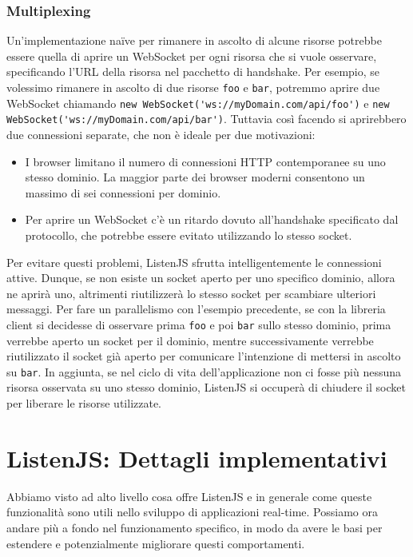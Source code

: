 \documentclass[12pt,a4paper,openright,twoside]{report}
\begin{document}
\subsection{Multiplexing}\label{multiplexing}
Un'implementazione naïve per rimanere in ascolto di alcune risorse potrebbe essere quella di aprire un WebSocket per ogni risorsa che si vuole osservare, specificando l'URL della risorsa nel pacchetto di handshake. Per esempio, se volessimo rimanere in ascolto di due risorse \lstinline{foo} e \lstinline{bar}, potremmo aprire due WebSocket chiamando \lstinline{new WebSocket('ws://myDomain.com/api/foo')} e \lstinline{new WebSocket('ws://myDomain.com/api/bar')}. Tuttavia così facendo si aprirebbero due connessioni separate, che non è ideale per due motivazioni:
\begin{itemize}
\item I browser limitano il numero di connessioni HTTP contemporanee su uno stesso dominio\cite{http11_rfc}. La maggior parte dei browser moderni consentono un massimo di sei connessioni per dominio.
\item Per aprire un WebSocket c'è un ritardo dovuto all'handshake specificato dal protocollo, che potrebbe essere evitato utilizzando lo stesso socket.
\end{itemize}

\bigskip

Per evitare questi problemi, ListenJS sfrutta intelligentemente le connessioni attive. Dunque, se non esiste un socket aperto per uno specifico dominio, allora ne aprirà uno, altrimenti riutilizzerà lo stesso socket per scambiare ulteriori messaggi. Per fare un parallelismo con l'esempio precedente, se con la libreria client si decidesse di osservare prima \lstinline{foo} e poi \lstinline{bar} sullo stesso dominio, prima verrebbe aperto un socket per il dominio, mentre successivamente verrebbe riutilizzato il socket già aperto per comunicare l'intenzione di mettersi in ascolto su \lstinline{bar}.
In aggiunta, se nel ciclo di vita dell'applicazione non ci fosse più nessuna risorsa osservata su uno stesso dominio, ListenJS si occuperà di chiudere il socket per liberare le risorse utilizzate.

\chapter{ListenJS: Dettagli implementativi}
Abbiamo visto ad alto livello cosa offre ListenJS e in generale come queste funzionalità sono utili nello sviluppo di applicazioni real-time. Possiamo ora andare più a fondo nel funzionamento specifico, in modo da avere le basi per estendere e potenzialmente migliorare questi comportamenti.
\end{document}

